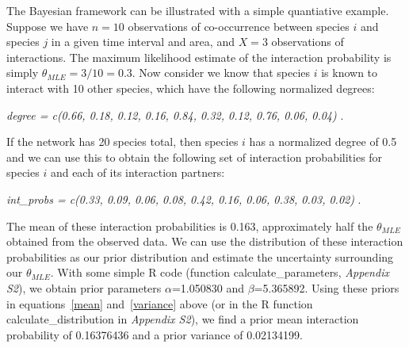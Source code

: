\documentclass[12pt]{article}
\begin{document}
  The Bayesian framework can be illustrated with a simple quantiative example. Suppose we have $n = 10$ observations of co-occurrence between species $i$ and species $j$ in a given time interval and area, and $X = 3$ observations of interactions. The maximum likelihood estimate of the interaction probability is simply $\theta_{MLE} = 3/10 = 0.3$. 
   Now consider we know that species $i$ is known to interact with 10 other species, which have the following normalized degrees:

    \vspace{12pt}
    \noindent\emph{
       degree = c(0.66, 0.18, 0.12, 0.16, 0.84, 0.32, 0.12, 0.76, 0.06, 0.04)
        }.
      \vspace{12pt}

    If the network has 20 species total, then species $i$ has a normalized degree of 0.5 and
    we can use this to obtain the following set of interaction probabilities for species $i$ and each of its interaction partners:

    \vspace{12pt}
    \noindent\emph{
       int\_probs = c(0.33, 0.09, 0.06, 0.08, 0.42, 0.16, 0.06, 0.38, 0.03, 0.02) }.
      \vspace{12pt}


    The mean of these interaction probabilities is 0.163, approximately half the $\theta_{MLE}$ obtained from the observed data. We can use the distribution of these interaction probabilities as our prior distribution and estimate the uncertainty surrounding our $\theta_{MLE}$. With some simple R code (function calculate\_parameters, \emph{Appendix S2}), we obtain prior parameters $\alpha$=1.050830
    and $\beta$=5.365892. Using these priors in equations~\ref{mean} 
    and~\ref{variance} above (or in the R function calculate\_distribution in \emph{Appendix S2}), we find a prior mean interaction probability of 0.16376436 and a prior variance of 0.02134199.
\end{document}
